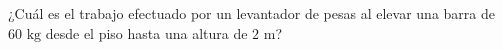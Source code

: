 \item ¿Cuál es el trabajo efectuado por un levantador de pesas al elevar una barra de $60 \text{ kg}$ desde el piso hasta una altura de $2 \text{ m}$?
